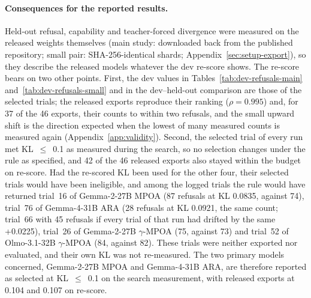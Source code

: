 \paragraph{Consequences for the reported results.} Held-out refusal,
capability and teacher-forced divergence were measured on the released weights
themselves (main study: downloaded back from the published repository; small
pair: SHA-256-identical shards; Appendix~\ref{sec:setup-export}), so they
describe the released models whatever the dev re-score shows. The re-score
bears on two other points. First, the dev values in
Tables~\ref{tab:dev-refusals-main} and~\ref{tab:dev-refusals-small} and in the
dev--held-out comparison are those of the selected trials; the released exports
reproduce their ranking ($\rho = 0.995$) and, for 37 of the 46 exports, their
counts to within two refusals, and the small upward shift is the direction
expected when the lowest of many measured counts is measured again
(Appendix~\ref{app:validity}). Second, the selected trial of every run met
KL~$\le$~0.1 as measured during the search, so no selection changes under the
rule as specified, and 42 of the 46 released exports also stayed within the
budget on re-score. Had the re-scored
KL been used for the other four, their selected trials would have been
ineligible, and among the logged trials the rule would have returned trial~16
of Gemma-2-27B MPOA (87 refusals at KL 0.0835, against 74), trial~76 of
Gemma-4-31B ARA (28 refusals at KL 0.0921, the same count; trial~66 with 45
refusals if every trial of that run had drifted by the same +0.0225), trial~26
of Gemma-2-27B $\gamma$-MPOA (75, against 73) and trial~52 of Olmo-3.1-32B
$\gamma$-MPOA (84, against 82). These trials were neither exported nor
evaluated, and their own KL was not re-measured. The two primary models
concerned, Gemma-2-27B MPOA and Gemma-4-31B ARA, are therefore reported as
selected at KL~$\le$~0.1 on the search measurement, with released exports at
0.104 and 0.107 on re-score.
